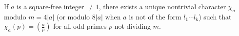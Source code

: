 If $a$ is a square-free integer $\neq 1$, there exists a unique nontrivial character $\chi_a$ modulo $m = 4|a|$ (or modulo $8|a|$ when $a$ is not of the form $l_1 \cdots l_k$) such that $\chi_a(p) = \left( \frac{a}{p} \right)$ for all odd primes $p$ not dividing $m$.
